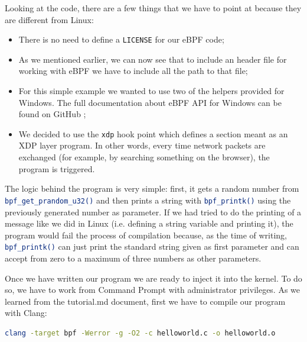 Looking at the code, there are a few things that we have to point at because they are different from Linux:

\begin{itemize}
	\item 
		There is no need to define a \colorbox{backcolour}{\lstinline[style=commandline, language=bash, breaklines=true]|LICENSE|} for our eBPF code;
	\item 
		As we mentioned earlier, we can now see that to include an header file for working with eBPF we have to include all the path to that file;
	\item 
		For this simple example we wanted to use two of the helpers provided for Windows.
		The full documentation about eBPF API for Windows can be found on GitHub \cite{eBPFWinDoc};
	\item 
		We decided to use the \colorbox{backcolour}{\lstinline[style=commandline, language=bash, breaklines=true]|xdp|} hook point which defines a section meant as an XDP layer program.
		In other words, every time network packets are exchanged (for example, by searching something on the browser), the program is triggered.
\end{itemize}

The logic behind the program is very simple: first, it gets a random number from \colorbox{backcolour}{\lstinline[style=commandline, language=bash, breaklines=true]|bpf_get_prandom_u32()|} and then prints a string with \colorbox{backcolour}{\lstinline[style=commandline, language=bash, breaklines=true]|bpf_printk()|} using the previously generated number as parameter.
If we had tried to do the printing of a message like we did in Linux (i.e. defining a string variable and printing it), the program would fail the process of compilation because, as the time of writing, \colorbox{backcolour}{\lstinline[style=commandline, language=bash, breaklines=true]|bpf_printk()|} can just print the standard string given as first parameter and can accept from zero to a maximum of three numbers as other parameters.

Once we have written our program we are ready to inject it into the kernel.
To do so, we have to work from Command Prompt with administrator privileges.
As we learned from the tutorial.md document, first we have to compile our program with Clang:

\begin{lstlisting}[style=commandline, language=bash, caption={``Hello world!''-like program compilation command in ebpf-for-windows.}]
	clang -target bpf -Werror -g -O2 -c helloworld.c -o helloworld.o
\end{lstlisting}


